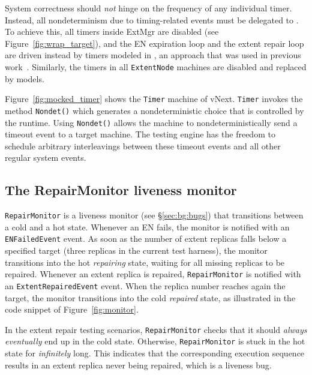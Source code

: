 System correctness should \emph{not} hinge on the frequency of any individual timer. Instead, all nondeterminism due to timing-related events must be delegated to \psharp. To achieve this, all timers inside ExtMgr are disabled (see Figure~\ref{fig:wrap_target}), and the EN expiration loop and the extent repair loop are driven instead by timers modeled in \psharp, an approach that was used in previous work~\cite{desai2015building}. Similarly, the timers in all \texttt{ExtentNode} machines are disabled and replaced by \psharp models.

Figure~\ref{fig:mocked_timer} shows the \texttt{Timer} machine of vNext. \texttt{Timer} invokes the \psharp method \texttt{Nondet()} which generates a nondeterministic choice that is controlled by the \psharp runtime. Using \texttt{Nondet()} allows the machine to nondeterministically send a timeout event to a target machine. The \psharp testing engine has the freedom to schedule arbitrary interleavings between these timeout events and all other regular system events.

\subsection{The RepairMonitor liveness monitor}
\label{sec:method:monitor}

\texttt{RepairMonitor} is a \psharp liveness monitor (see \S\ref{sec:bg:bugs}) that transitions between a cold and a hot state. Whenever an EN fails, the monitor is notified with an \texttt{ENFailedEvent} event. As soon as the number of extent replicas falls below a specified target (three replicas in the current \psharp test harness), the monitor transitions into the hot \emph{repairing} state, waiting for all missing replicas to be repaired. Whenever an extent replica is repaired, \texttt{RepairMonitor} is notified with an \texttt{ExtentRepairedEvent} event. When the replica number reaches again the target, the monitor transitions into the cold \emph{repaired} state, as illustrated in the code snippet of Figure~\ref{fig:monitor}.

In the extent repair testing scenarios, \texttt{RepairMonitor} checks that it should \emph{always eventually} end up in the cold state. Otherwise, \texttt{RepairMonitor} is stuck in the hot state for \emph{infinitely} long. This indicates that the corresponding execution sequence results in an extent replica never being repaired, which is a liveness bug.

